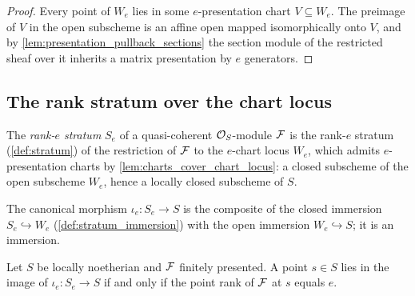 \begin{proof}
  \leanok
  Every point of \(W_e\) lies in some \(e\)-presentation chart
  \(V \subseteq W_e\).  The preimage of \(V\) in the open subscheme is an
  affine open mapped isomorphically onto \(V\), and by
  \cref{lem:presentation_pullback_sections} the section module of the
  restricted sheaf over it inherits a matrix presentation by \(e\)
  generators.
\end{proof}

\subsection{The rank stratum over the chart locus}

\begin{definition}
  \label{def:rank_stratum}
  \leanok
  The \emph{rank-\(e\) stratum} \(S_e\) of a quasi-coherent
  \(\mathcal{O}_S\)-module \(\mathcal{F}\) is the rank-\(e\) stratum (\cref{def:stratum}) of
  the restriction of \(\mathcal{F}\) to the \(e\)-chart locus \(W_e\), which admits
  \(e\)-presentation charts by \cref{lem:charts_cover_chart_locus}: a
  closed subscheme of the open subscheme \(W_e\), hence a locally closed
  subscheme of \(S\).
\end{definition}

\begin{definition}
  \label{def:rank_stratum_immersion}
  \leanok
  The canonical morphism \(\iota_e : S_e \to S\) is the composite of the
  closed immersion \(S_e \hookrightarrow W_e\)
  (\cref{def:stratum_immersion}) with the open immersion
  \(W_e \hookrightarrow S\); it is an immersion.
\end{definition}

\begin{theorem}
  \label{thm:mem_range_rank_stratum}
  \leanok
  Let \(S\) be locally noetherian and \(\mathcal{F}\) finitely presented.  A point
  \(s \in S\) lies in the image of \(\iota_e : S_e \to S\) if and only if
  the point rank of \(\mathcal{F}\) at \(s\) equals \(e\).
\end{theorem}


